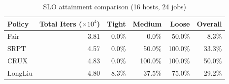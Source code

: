 \begin{table}[t]
\centering
\caption{SLO attainment comparison (16 hosts, 24 jobs)}
\label{tab:slo_16host}
\begin{tabular}{l|r|r|r|r|r}
\hline
Policy & Total Iters ($\times 10^4$) & Tight & Medium & Loose & Overall \\
\hline
Fair & 3.81 & 0.0\% & 0.0\% & 50.0\% & 8.3\% \\
SRPT & 4.57 & 0.0\% & 50.0\% & 100.0\% & 33.3\% \\
CRUX & 4.83 & 0.0\% & 100.0\% & 100.0\% & 50.0\% \\
LongLiu & 4.80 & 8.3\% & 37.5\% & 75.0\% & 29.2\% \\
\hline
\end{tabular}
\end{table}
